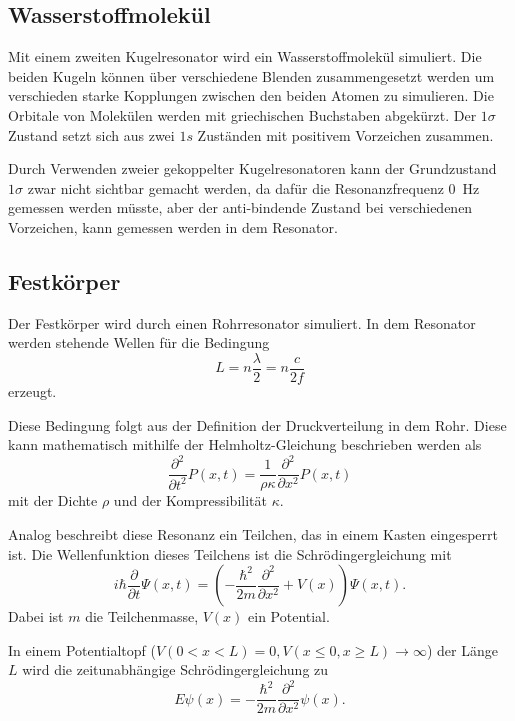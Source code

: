\subsection{Wasserstoffmolekül}
\label{sec:Wasserstoffmolekül}

Mit einem zweiten Kugelresonator wird ein Wasserstoffmolekül simuliert. 
Die beiden Kugeln können über verschiedene Blenden zusammengesetzt werden um verschieden starke Kopplungen zwischen den beiden Atomen zu simulieren. 
Die Orbitale von Molekülen werden mit griechischen Buchstaben abgekürzt. Der $1\sigma$ Zustand setzt sich aus zwei $1s$ Zuständen mit positivem Vorzeichen zusammen. 

Durch Verwenden zweier gekoppelter Kugelresonatoren kann der Grundzustand $1\sigma$ zwar nicht sichtbar gemacht werden, da dafür die Resonanzfrequenz \SI{0}{\hertz} gemessen werden müsste, aber der anti-bindende Zustand bei verschiedenen Vorzeichen, kann gemessen werden in dem Resonator. 

\subsection{Festkörper}
\label{sec:Festkörper}
Der Festkörper wird durch einen Rohrresonator simuliert. In dem Resonator werden stehende Wellen für die Bedingung 
\begin{equation*}
    L = n \frac{\lambda}{2} = n \frac{c}{2f}
\end{equation*}
erzeugt. 

Diese Bedingung folgt aus der Definition der Druckverteilung in dem Rohr. Diese kann mathematisch mithilfe der Helmholtz-Gleichung beschrieben werden als 
\begin{equation*}
    \frac{\partial^2}{\partial t^2} P(x,t) = \frac{1}{\rho\kappa}\frac{\partial^2}{\partial x^2} P(x,t)
\end{equation*}
mit der Dichte $\rho$ und der Kompressibilität $\kappa$. 

Analog beschreibt diese Resonanz ein Teilchen, das in einem Kasten eingesperrt ist. 
Die Wellenfunktion dieses Teilchens ist die Schrödingergleichung mit 
\begin{equation*}
    i \hbar \frac{\partial}{\partial t} \Psi(x,t) = \left(- \frac{\hbar^2}{2m} \frac{\partial^2}{\partial x^2} + V(x)\right) \Psi(x,t).
\end{equation*}
Dabei ist $m$ die Teilchenmasse, $V(x)$ ein Potential. 

In einem Potentialtopf ($V(0 < x < L) = 0, V(x \leq 0, x \geq L) \to \infty$) der Länge $L$ wird die zeitunabhängige Schrödingergleichung zu 
\begin{equation*}
    E \psi(x) = - \frac{\hbar^2}{2m} \frac{\partial^2}{\partial x^2} \psi(x).
\end{equation*}

